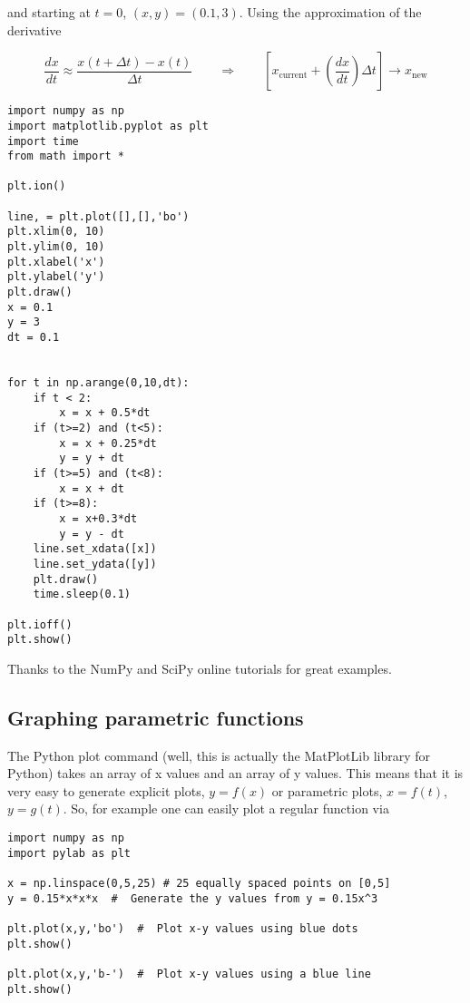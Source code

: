 and starting at \(t=0\), \((x,y)  = (0.1, 3)\). Using the approximation
of the derivative

\[\displaystyle \frac{dx}{dt} \approx \frac{x(t+\Delta t) - x(t)}{\Delta t}
\quad\quad \Rightarrow \quad\quad
 \left[ x_\text{current} + \left(\frac{dx}{dt}\right) \Delta t \right] \rightarrow   x_\text{new}\]

\begin{verbatim}
import numpy as np
import matplotlib.pyplot as plt
import time
from math import *

plt.ion()

line, = plt.plot([],[],'bo')
plt.xlim(0, 10)
plt.ylim(0, 10)
plt.xlabel('x')
plt.ylabel('y')
plt.draw()
x = 0.1
y = 3
dt = 0.1


for t in np.arange(0,10,dt):
    if t < 2:
        x = x + 0.5*dt
    if (t>=2) and (t<5):
        x = x + 0.25*dt
        y = y + dt
    if (t>=5) and (t<8):
        x = x + dt
    if (t>=8):
        x = x+0.3*dt
        y = y - dt
    line.set_xdata([x])
    line.set_ydata([y])
    plt.draw()
    time.sleep(0.1)

plt.ioff()
plt.show()
\end{verbatim}

Thanks to the NumPy and SciPy online tutorials for great examples.

\hypertarget{graphing-parametric-functions}{%
\subsection{Graphing parametric
functions}\label{graphing-parametric-functions}}

The Python plot command (well, this is actually the MatPlotLib library
for Python) takes an array of x values and an array of y values. This
means that it is very easy to generate explicit plots, \(y=f(x)\) or
parametric plots, \(x=f(t)\), \(y=g(t)\). So, for example one can easily
plot a regular function via

\begin{verbatim}
import numpy as np
import pylab as plt

x = np.linspace(0,5,25) # 25 equally spaced points on [0,5]
y = 0.15*x*x*x  #  Generate the y values from y = 0.15x^3

plt.plot(x,y,'bo')  #  Plot x-y values using blue dots
plt.show()

plt.plot(x,y,'b-')  #  Plot x-y values using a blue line
plt.show()
\end{verbatim}

